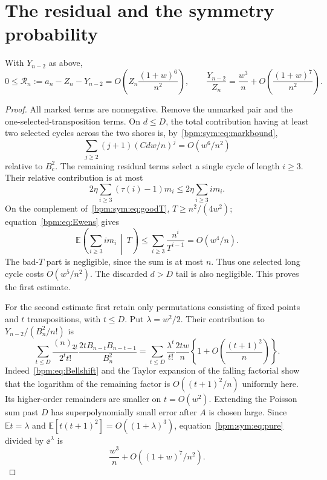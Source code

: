 \documentclass[11pt,a4paper]{article}
\theoremstyle{remark}\newtheorem{remark}[theorem]{Remark}%
\newcommand{\E}{\mathbb E}\newcommand{\Pp}{\mathbb P}
\newcommand{\fall}[2]{(#1)_{\underline{#2}}}\newcommand{\rise}[2]{(#1)^{\overline{#2}}}
\begin{document}
\section{The residual and the symmetry probability}
\begin{lemma}\label{bpm:sym:lem:residual}
With $Y_{n-2}$ as above,
\begin{equation}\label{bpm:sym:eq:residual}
 0\le \mathcal R_n:=a_n-Z_n-Y_{n-2}
 =O\!\left(Z_n\frac{(1+w)^6}{n^2}\right),
 \qquad
 \frac{Y_{n-2}}{Z_n}=\frac{w^3}{n}
 +O\!\left(\frac{(1+w)^7}{n^2}\right).
\end{equation}
\end{lemma}
\begin{proof}
All marked terms are nonnegative. Remove the unmarked pair and the one-selected-transposition terms. On $d\le D$, the total contribution having at least two selected cycles across the two shores is, by~\eqref{bpm:sym:eq:markbound},
\[
 \sum_{j\ge2}(j+1)(Cdw/n)^j=O(w^6/n^2)
\]
relative to $B_c^2$. The remaining residual terms select a single cycle of length $i\ge3$. Their relative contribution is at most
\[
 2\eta\sum_{i\ge3}(\tau(i)-1)m_i
 \le2\eta\sum_{i\ge3}i m_i.
\]
On the complement of~\eqref{bpm:sym:eq:goodT}, $T\ge n^2/(4w^2)$; equation~\eqref{bpm:eq:Ewens} gives
\begin{equation}\label{bpm:sym:eq:longmoment}
 \E\left(\sum_{i\ge3}i m_i\,\middle|\,T\right)
 \le\sum_{i\ge3}\frac{n^i}{T^{i-1}}
 =O(w^4/n).
\end{equation}
The bad-$T$ part is negligible, since the sum is at most $n$. Thus one selected long cycle costs $O(w^5/n^2)$. The discarded $d>D$ tail is also negligible. This proves the first estimate.

For the second estimate first retain only permutations consisting of fixed points and $t$ transpositions, with $t\le D$. Put $\lambda=w^2/2$. Their contribution to $Y_{n-2}/(B_n^2/n!)$ is
\begin{equation}\label{bpm:sym:eq:pure}
 \sum_{t\le D}\frac{\fall n{2t}}{2^t t!}
       \frac{2t B_{n-t}B_{n-t-1}}{B_n^2}
 =\sum_{t\le D}\frac{\lambda^t}{t!}\frac{2tw}{n}
       \left\{1+O\!\left(\frac{(t+1)^2}{n}\right)\right\}.
\end{equation}
Indeed~\eqref{bpm:eq:Bellshift} and the Taylor expansion of the falling factorial show that the logarithm of the remaining factor is $O((t+1)^2/n)$ uniformly here. Its higher-order remainders are smaller on $t=O(w^2)$. Extending the Poisson sum past $D$ has superpolynomially small error after $A$ is chosen large. Since $\E t=\lambda$ and $\E[t(t+1)^2]=O((1+\lambda)^3)$, equation~\eqref{bpm:sym:eq:pure} divided by $\ee^\lambda$ is
\[
 \frac{w^3}{n}+O((1+w)^7/n^2).
\]


\end{proof}
\end{document}
